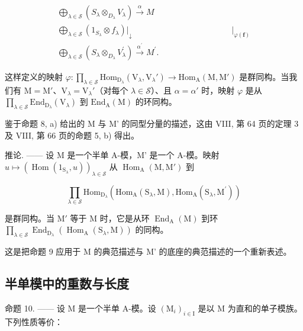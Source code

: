 \[
\begin{array}{c} \bigoplus_ {\lambda \in \mathscr {S}} (S _ {\lambda} \otimes_ {D _ {\lambda}} V _ {\lambda}) \xrightarrow {\alpha} M \\ \bigoplus_ {\lambda \in \mathscr {S}} (1 _ {S _ {\lambda}} \otimes f _ {\lambda}) \Bigg | _ {\downarrow} \qquad \qquad \qquad \qquad \qquad \qquad \Bigg | _ {\varphi (\boldsymbol {f})} \\ \bigoplus_ {\lambda \in \mathscr {S}} (S _ {\lambda} \otimes_ {D _ {\lambda}} V _ {\lambda} ^ {\prime}) \xrightarrow {\alpha^ {\prime}} M ^ {\prime}. \end{array}
\]

这样定义的映射 \(\varphi : \prod_{\lambda \in \mathcal{S}} \mathrm{Hom}_{\mathrm{D}_{\lambda}}(\mathrm{V}_{\lambda}, \mathrm{V}_{\lambda}') \to \mathrm{Hom}_{\mathrm{A}}(\mathrm{M}, \mathrm{M}')\) 是群同构。当我们有 \(\mathrm{M} = \mathrm{M}'\)、\(\mathrm{V}_{\lambda} = \mathrm{V}_{\lambda}'\)（对每个 \(\lambda \in \mathcal{S}\)）、且 \(\alpha = \alpha'\) 时，映射 \(\varphi\) 是从 \(\prod_{\lambda \in \mathcal{S}} \mathrm{End}_{\mathrm{D}_{\lambda}}(\mathrm{V}_{\lambda})\) 到 \(\mathrm{End}_{\mathrm{A}}(\mathrm{M})\) 的环同构。

鉴于命题 8, a) 给出的 M 与 M' 的同型分量的描述，这由 VIII, 第 64 页的定理 3 及 VIII, 第 66 页的命题 5, b) 得出。

推论. —— 设 M 是一个半单 A-模，M' 是一个 A-模。映射 \(u \mapsto (\operatorname{Hom}(1_{\mathrm{S}_{\lambda}}, u))_{\lambda \in \mathcal{S}}\) 从 \(\operatorname{Hom}_{\mathrm{A}}(\mathrm{M}, \mathrm{M}')\) 到

\[
\prod_ {\lambda \in \mathcal {S}} \mathrm{Hom} _ {\mathrm{D} _ {\lambda}} (\mathrm{Hom} _ {\mathrm{A}} (\mathrm{S} _ {\lambda}, \mathrm{M}), \mathrm{Hom} _ {\mathrm{A}} (\mathrm{S} _ {\lambda}, \mathrm{M} ^ {\prime}))
\]

是群同构。当 \(\mathrm{M}'\) 等于 \(\mathrm{M}\) 时，它是从环 \(\operatorname{End}_{\mathrm{A}}(\mathrm{M})\) 到环 \(\prod_{\lambda \in \mathcal{S}} \operatorname{End}_{\mathrm{D}_{\lambda}}(\operatorname{Hom}_{\mathrm{A}}(\mathrm{S}_{\lambda}, \mathrm{M}))\) 的同构。

这是把命题 9 应用于 M 的典范描述与 M' 的底座的典范描述的一个重新表述。

\subsection{半单模中的重数与长度}

命题 10. —— 设 M 是一个半单 A-模。设 \((\mathrm{M}_{i})_{i\in\mathrm{I}}\) 是以 M 为直和的单子模族。下列性质等价：

